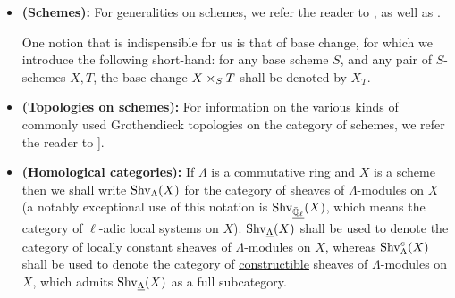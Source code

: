         \begin{convention} \label{conv: algebraic_geometry}
            \noindent
            \begin{itemize}
                \item \textbf{(Schemes):} For generalities on schemes, we refer the reader to \cite[Chapters II and III]{hartshorne}, as well as \cite[\href{https://stacks.math.columbia.edu/tag/01H8}{Tag 01H8}, \href{https://stacks.math.columbia.edu/tag/01QL}{Tag 01QL}, and \href{https://stacks.math.columbia.edu/tag/0209}{Tag 0209}]{stacks}.
                
                One notion that is indispensible for us is that of base change, for which we introduce the following short-hand: for any base scheme $S$, and any pair of $S$-schemes $X, T$, the base change $X \x_S T$ shall be denoted by $X_T$.
                \item \textbf{(Topologies on schemes):} For information on the various kinds of commonly used Grothendieck topologies on the category of schemes, we refer the reader to \cite[\href{https://stacks.math.columbia.edu/tag/020K}{Tag 020K} and \href{https://stacks.math.columbia.edu/tag/0238}{Tag 0238}]{stacks}].
                \item \textbf{(Homological categories):} If $\Lambda$ is a commutative ring and $X$ is a scheme then we shall write $\mathrm{Shv}_{\Lambda}(X)$ for the category of sheaves of $\Lambda$-modules on $X$ (a notably exceptional use of this notation is $\mathrm{Shv}_{\underline{\bar{\mathbb{Q}}_{\ell}}}(X)$, which means the category of $\ell$-adic local systems on $X$). $\mathrm{Shv}_{\underline{\Lambda}}(X)$ shall be used to denote the category of locally constant sheaves of $\Lambda$-modules on $X$, whereas $\mathrm{Shv}_{\Lambda}^c(X)$ shall be used to denote the category of \href{https://stacks.math.columbia.edu/tag/05BE}{\underline{constructible}} sheaves of $\Lambda$-modules on $X$, which admits $\mathrm{Shv}_{\underline{\Lambda}}(X)$ as a full subcategory.
            \end{itemize}
        \end{convention}